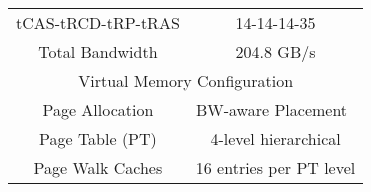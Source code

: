 \begin {table}[t]
\begin{center}
\begin{tabular}{|c|c|}
     \small{tCAS-tRCD-tRP-tRAS}   &  14-14-14-35     \\ 
     Total Bandwidth      &  204.8 GB/s               \\ \hline
     \multicolumn{2}{|c|}{Virtual Memory Configuration}     \\ \hline
     Page Allocation      &  BW-aware Placement~\cite{batman,bwa}  \\ 
     Page Table (PT)      &  4-level hierarchical    \\ 
     Page Walk Caches     &  16 entries per PT level       \\ \hline

\end{tabular}
\label{table:method_system}
\vspace{-0.0in}
\end{center}
\normalsize
\end{table}
